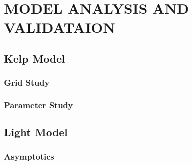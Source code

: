 \chapter{MODEL ANALYSIS AND VALIDATAION} \label{ch:model_analysis}

\section{Kelp Model}
\subsection{Grid Study}

\subsection{Parameter Study}

\section{Light Model}

\subsection{Asymptotics}